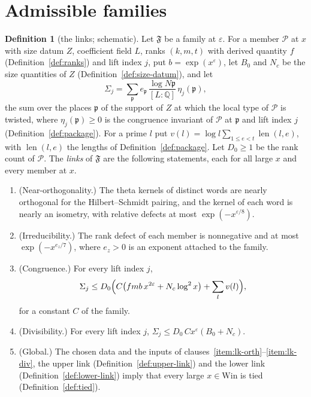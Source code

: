 \documentclass[11pt]{amsbook}
\theoremstyle{plain}
\theoremstyle{definition}
\newtheorem{definition}[theorem]{Definition}
\theoremstyle{remark}
\numberwithin{equation}{section}
\numberwithin{figure}{chapter}
\numberwithin{table}{chapter}
\newcommand{\Q}{\mathbb{Q}}
\newcommand{\eps}{\varepsilon}
\newcommand{\Fam}{\mathfrak{F}}
\newcommand{\Win}{\mathrm{Win}}
\newcommand{\shalen}{\operatorname{len}}
\begin{document}
\section{Admissible families}

\begin{definition}[the links; schematic]\label{def:links}
Let $\Fam$ be a family at $\eps$. For a member $\mathcal P$ at $x$
with size datum $Z$, coefficient field $L$, ranks $(k,m,t)$ with
derived quantity $f$ (Definition~\ref{def:ranks}) and lift index $j$,
put $b=\exp(x^\eps)$, let $B_0$ and $N_c$ be the size quantities of
$Z$ (Definition~\ref{def:size-datum}), and let
\[
\Sigma_j=\sum_{\mathfrak p}e_{\mathfrak p}\,
\frac{\log N\mathfrak p}{[L:\Q]}\,\eta_j(\mathfrak p),
\]
the sum over the places $\mathfrak p$ of the support of $Z$ at which
the local type of $\mathcal P$ is twisted, where
$\eta_j(\mathfrak p)\ge0$ is the congruence invariant of $\mathcal P$
at $\mathfrak p$ and lift index $j$ (Definition~\ref{def:package}).
For a prime $l$ put $v(l)=\log l\sum_{1\le e<t}\shalen(l,e)$, with
$\shalen(l,e)$ the lengths of Definition~\ref{def:package}. Let
$D_0\ge1$ be the rank count of $\mathcal P$. The \emph{links} of
$\Fam$ are the following statements, each for all large $x$ and
every member at $x$.
\begin{enumerate}[label=(\arabic*)]
\item\label{item:lk-orth}
(Near-orthogonality.) The theta kernels of distinct words are nearly
orthogonal for the Hilbert--Schmidt pairing, and the kernel of each
word is nearly an isometry, with relative defects at most
$\exp(-x^{\eps/8})$.
\item\label{item:lk-irr}
(Irreducibility.) The rank defect of each member is nonnegative and
at most $\exp(-x^{e_z/7})$, where $e_z>0$ is an exponent attached to
the family.
\item\label{item:lk-cong} (Congruence.) For every lift index $j$,
\[
\Sigma_j\le D_0\Bigl(C\bigl(fmb\,x^{2\eps}+N_c\log^2x\bigr)
+\sum_lv(l)\Bigr),
\]
for a constant $C$ of the family.
\item\label{item:lk-div} (Divisibility.) For every lift index $j$,
$\Sigma_j\le D_0\,Cx^\eps(B_0+N_c)$.
\item\label{item:lk-glob} (Global.) The chosen data and the inputs of
clauses~\ref{item:lk-orth}--\ref{item:lk-div}, the upper link
(Definition~\ref{def:upper-link}) and the lower link
(Definition~\ref{def:lower-link}) imply that every large $x\in\Win$
is tied (Definition~\ref{def:tied}).
\end{enumerate}
\end{definition}
\end{document}
